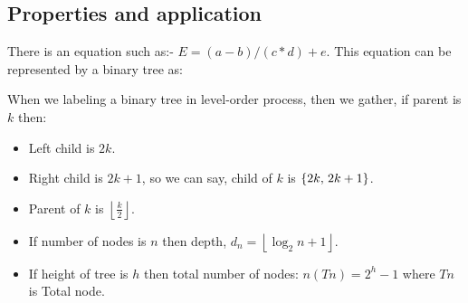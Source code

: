 \documentclass[pt=100]{article}
\begin{document}
\subsection{Properties and application}
There is an equation such as:- $E = (a-b) / (c * d) + e$. This equation can be represented by a binary tree as:\\
\begin{center}
\end{center}

When we labeling a binary tree in level-order process, then we gather, if parent is $k$ then:
\begin{itemize}
	\item Left child is $2k$.
	\item Right child is $2k+1$, so we can say, child of $k$ is $\{2k,\hspace{0.5mm}2k+1\}$.
	\item Parent of $k$ is $\left\lfloor\frac{k}{2}\right\rfloor$.
	\item If number of nodes is $n$ then depth, $d_n = \left\lfloor\log_2n+1\right\rfloor$.
	\item If height of tree is $h$ then total number of nodes: $n(Tn) = 2^h-1$ where $Tn$ is Total node.
\end{itemize}
\end{document}
